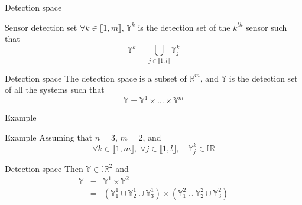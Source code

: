 \documentclass{beamer}
\begin{document}
            \begin{frame}{Detection space}
                \begin{block}{Sensor detection set}
                    $\forall k \in \llbracket 1, m\rrbracket$, $\mathbb{Y}^k$ is the detection set of the $k^{th}$ sensor such that
                    \begin{equation}
                        \mathbb{Y}^k = \bigcup_{j \in \llbracket 1, l\rrbracket} \mathbb{Y}_j^k
                    \end{equation}
                \end{block}
                \begin{block}{Detection space}
                    The detection space is a subset of $\mathbb{R}^m$, and $\mathbb{Y}$ is the detection set of all the systems such that
                    \begin{equation}
                        \mathbb{Y} = \mathbb{Y}^1 \times \dots \times \mathbb{Y}^m
                    \end{equation}
                \end{block}
            \end{frame}

            \begin{frame}{Example}
                \begin{exampleblock}{Example}
                    Assuming that $n = 3$, $m = 2$, and
                    $$\forall k \in \llbracket 1, m\rrbracket, \;  \forall j \in \llbracket 1, l\rrbracket, \quad \mathbb{Y}_j^k \in \mathbb{IR}$$
                \end{exampleblock}
                \begin{exampleblock}{Detection space}
                    Then $\mathbb{Y} \in \mathbb{IR}^2$ and
                    \begin{eqnarray}
                        \mathbb{Y} & = & \mathbb{Y}^1 \times \mathbb{Y}^2 \\
                        & = & \left(\mathbb{Y}_1^1 \cup \mathbb{Y}_2^1 \cup \mathbb{Y}_3^1\right) \times \left(\mathbb{Y}_1^2 \cup \mathbb{Y}_2^2 \cup \mathbb{Y}_3^2\right)
                    \end{eqnarray}
                \end{exampleblock}
            \end{frame}
\end{document}
